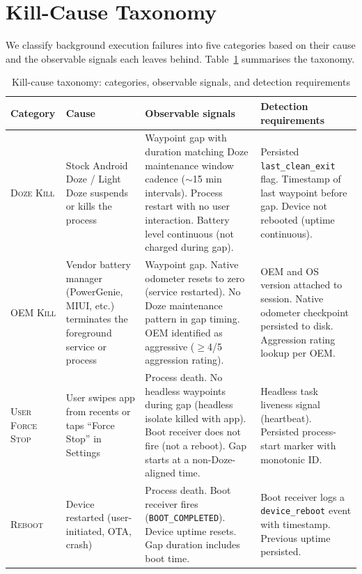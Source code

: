 \documentclass[10pt,journal,compsoc]{IEEEtran}
\begin{document}

\section{Kill-Cause Taxonomy}
\label{sec:taxonomy}

We classify background execution failures into five categories based on
their cause and the observable signals each leaves behind.
Table~\ref{tab:taxonomy} summarises the taxonomy.

\begin{table}[t]
\caption{Kill-cause taxonomy: categories, observable signals, and detection requirements}
\label{tab:taxonomy}
\small
\begin{tabular}{@{}p{2.4cm}p{3.2cm}p{4.8cm}p{4.8cm}@{}}
\toprule
Category & Cause & Observable signals & Detection requirements \\
\midrule
\textsc{Doze Kill} &
Stock Android Doze / Light Doze suspends or kills the process &
Waypoint gap with duration matching Doze maintenance window cadence ($\sim$15 min intervals). Process restart with no user interaction. Battery level continuous (not charged during gap). &
Persisted \texttt{last\_clean\_exit} flag. Timestamp of last waypoint before gap. Device not rebooted (uptime continuous). \\

\textsc{OEM Kill} &
Vendor battery manager (PowerGenie, MIUI, etc.) terminates the foreground service or process &
Waypoint gap. Native odometer resets to zero (service restarted). No Doze maintenance pattern in gap timing. OEM identified as aggressive ($\geq$4/5 aggression rating). &
OEM and OS version attached to session. Native odometer checkpoint persisted to disk. Aggression rating lookup per OEM. \\

\textsc{User Force Stop} &
User swipes app from recents or taps ``Force Stop'' in Settings &
Process death. No headless waypoints during gap (headless isolate killed with app). Boot receiver does not fire (not a reboot). Gap starts at a non-Doze-aligned time. &
Headless task liveness signal (heartbeat). Persisted process-start marker with monotonic ID. \\

\textsc{Reboot} &
Device restarted (user-initiated, OTA, crash) &
Process death. Boot receiver fires (\texttt{BOOT\_COMPLETED}). Device uptime resets. Gap duration includes boot time. &
Boot receiver logs a \texttt{device\_reboot} event with timestamp. Previous uptime persisted. \\


\end{tabular}
\end{table}
\end{document}
